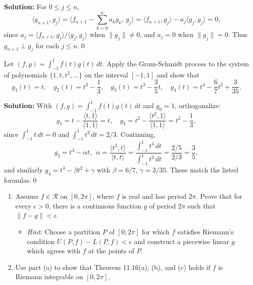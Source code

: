 \noindent\textbf{Solution:}
For $0\le j\le n$,
\[
\langle g_{n+1}, g_j\rangle = \Big\langle f_{n+1} - \sum_{k=0}^n a_k g_k,\, g_j\Big\rangle = \langle f_{n+1}, g_j\rangle - a_j\langle g_j, g_j\rangle = 0,
\]
since $a_j = \langle f_{n+1}, g_j\rangle/\langle g_j, g_j\rangle$ when $\|g_j\|\neq 0$, and $a_j=0$ when $\|g_j\|=0$. Thus $g_{n+1}\perp g_j$ for each $j\le n$.\qed


\begin{problembox}
Let $(f, g) = \int_{-1}^1 f(t)g(t) \, dt$. Apply the Gram-Schmidt process to the system of polynomials $\{1, t, t^2, \dots\}$ on the interval $[-1, 1]$ and show that
\[
g_1(t) = t, \quad g_2(t) = t^2 - \frac{1}{3}, \quad g_3(t) = t^3 - \frac{3}{5}t, \quad g_4(t) = t^4 - \frac{6}{7}t^2 + \frac{3}{35}.
\]
\end{problembox}

\noindent\textbf{Solution:}
With $(f,g)=\int_{-1}^1 f(t)g(t)\,dt$ and $g_0=1$, orthogonalize:
\[
g_1 = t - \frac{\langle t,1\rangle}{\langle 1,1\rangle} = t,\quad
g_2 = t^2 - \frac{\langle t^2,1\rangle}{\langle 1,1\rangle} = t^2 - \frac{1}{3},
\]
since $\int_{-1}^1 t\,dt=0$ and $\int_{-1}^1 t^2\,dt=2/3$. Continuing,
\[
g_3 = t^3 - \alpha t,\ \ \alpha = \frac{\langle t^3, t\rangle}{\langle t,t\rangle} = \frac{\int_{-1}^1 t^4\,dt}{\int_{-1}^1 t^2\,dt} = \frac{2/5}{2/3} = \frac{3}{5},
\]
and similarly $g_4 = t^4 - \beta t^2 + \gamma$ with $\beta=6/7$, $\gamma=3/35$. These match the listed formulas.\qed


\begin{problembox}
\begin{enumerate}[label=(\alph*)]
\item Assume $f \in \mathcal{R}$ on $[0, 2\pi]$, where $f$ is real and has period $2\pi$. Prove that for every $\epsilon > 0$, there is a continuous function $g$ of period $2\pi$ such that $\|f - g\| < \epsilon$.
\begin{itemize}
\item \textit{Hint:} Choose a partition $P$ of $[0, 2\pi]$ for which $f$ satisfies Riemann's condition $U(P, f) - L(P, f) < \epsilon$ and construct a piecewise linear $g$ which agrees with $f$ at the points of $P$.
\end{itemize}
\item Use part (a) to show that Theorem 11.16(a), (b), and (c) holds if $f$ is Riemann integrable on $[0, 2\pi]$.
\end{enumerate}
\end{problembox}

